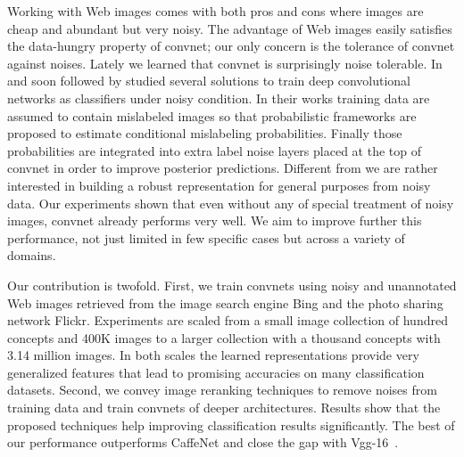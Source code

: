 \documentclass[preprint,12pt]{elsarticle}
\begin{document}
Working with Web images comes with both pros and cons where images are cheap and abundant but very noisy. The advantage of Web images easily satisfies the data-hungry property of convnet; our only concern is the tolerance of convnet against noises. Lately we learned that convnet is surprisingly noise tolerable. In~\cite{sukhbaatar2014learning} and soon followed by \cite{xiao2015learning} studied several solutions to train deep convolutional networks as classifiers under noisy condition. In their works training data are assumed to contain mislabeled images so that probabilistic frameworks are proposed to estimate conditional mislabeling probabilities. Finally those probabilities are integrated into extra label noise layers placed at the top of convnet in order to improve posterior predictions. Different from \cite{sukhbaatar2014learning,xiao2015learning} we are rather interested in building a robust representation for general purposes from noisy data. Our experiments shown that even without any of special treatment of noisy images, convnet already performs very well. We aim to improve further this performance, not just limited in few specific cases but across a variety of domains. 

Our contribution is twofold. First, we train convnets using noisy and unannotated Web images retrieved from the image search engine Bing and the photo sharing network Flickr. Experiments are scaled from a small image collection of  hundred concepts and 400K images to a larger collection with a thousand concepts with 3.14 million images. In both scales the learned representations provide very generalized features that lead to promising accuracies on many classification datasets. Second, we convey image reranking techniques to remove noises from training data and train convnets of deeper architectures. Results show that the proposed techniques help improving classification results significantly. The best of our performance outperforms CaffeNet and close the gap with Vgg-16~\cite{DBLP:journals/corr/SimonyanZ14a}. 
\end{document}
